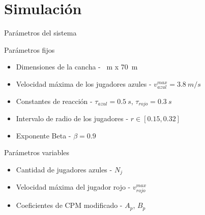 \section{Simulación}\label{sec:simulacion}
\begin{frame}{Parámetros del sistema}
    \begin{block}{Parámetros fijos}
        \begin{itemize}
            \item Dimensiones de la cancha - \ m x 70\ m\)
            \item Velocidad máxima de los jugadores azules - \(v_{azul}^{max} = 3.8\ m/s\)
            \item Constantes de reacción - \(\tau_{azul} = 0.5\ s\), \(\tau_{rojo} = 0.3\ s\)
            \item Intervalo de radio de los jugadores - \(r \in [0.15, 0.32]\)
            \item Exponente Beta - \(\beta = 0.9\)
        \end{itemize}
    \end{block}
    \begin{block}{Parámetros variables}
        \begin{itemize}
            \item Cantidad de jugadores azules - \(N_j\)
            \item Velocidad máxima del jugador rojo - \(v_{rojo}^{max}\)
            \item Coeficientes de CPM modificado - \(A_p\), \(B_p\)
        \end{itemize}
    \end{block}
\end{frame}

